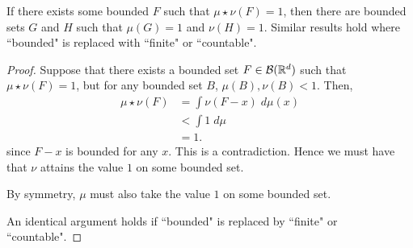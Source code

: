 \documentclass{unswmaths}
\begin{document}
\begin{theorem}
    If there exists some bounded $F$
    such that $\mu\star\nu(F) = 1$, then there are bounded
    sets $G$ and $H$ such that $\mu(G) = 1$ and $\nu(H) = 1$.
    Similar results hold where ``bounded" is replaced with
    ``finite" or ``countable".
\end{theorem}
\begin{proof}
    Suppose that there exists a bounded set $F \in \mathcal{B}(\mathbb{R}^d)$
    such that $\mu\star\nu(F) = 1$, but for any bounded
    set $B$, $\mu(B),\nu(B) < 1$. Then,
    \begin{align*}
        \mu\star\nu(F) &= \int \nu(F-x) \;d\mu(x)\\
        &< \int 1\;d\mu\\
        &= 1.
    \end{align*}
    since $F-x$ is bounded for any $x$. This is a contradiction.
    Hence we must have
    that $\nu$ attains the value $1$ on some bounded set.
    
    By symmetry, $\mu$ must also take the value $1$ on some bounded set.
    
    An identical argument holds if ``bounded" is replaced by ``finite" or
    ``countable".
\end{proof}
\end{document}
